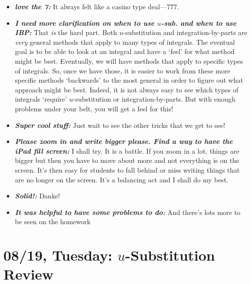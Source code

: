 \documentclass[11pt,letterpaper]{article}
\begin{document}
\begin{itemize}
\item {\bfseries\itshape love the 7:} It always felt like a casino type deal---777. 

\item {\bfseries\itshape I need more clarification on when to use $u$-sub. and when to use IBP:} That \textit{is} the hard part. Both $u$-substitution and integration-by-parts are \textit{very} general methods that apply to many types of integrals. The eventual goal is to be able to look at an integral and have a `feel' for what method might be best. Eventually, we will have methods that apply to specific types of integrals. So, once we have those, it is easier to work from these more specific methods `backwards' to the most general in order to figure out what approach might be best. Indeed, it is not always easy to see which types of integrals `require' $u$-substitution or integration-by-parts. But with enough problems under your belt, you will get a feel for this!

\item {\bfseries\itshape Super cool stuff:} Just wait to see the other tricks that we get to see!

\item {\bfseries\itshape Please zoom in and write bigger please. Find a way to have the iPad fill screen:} I shall try. It is a battle. If you zoom in a lot, things are bigger but then you have to move about more and not everything is on the screen. It's then easy for students to fall behind or miss writing things that are no longer on the screen. It's a balancing act and I shall do my best. 

\item {\bfseries\itshape Solid!:} Danke!

\item {\bfseries\itshape It was helpful to have some problems to do:} And there's lots more to be seen on the homework \Laughey
\end{itemize}

\newpage
\section*{08/19, Tuesday: $u$-Substitution Review\label{08-19}}
\end{document}
